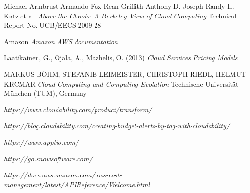 \documentclass[licencjacka,en]{thesisclass}
\begin{document}
\begin{thebibliography}{99}

Michael Armbrust Armando Fox Rean Griffith Anthony D. Joseph Randy H. Katz et al.
\textit{Above the Clouds: A Berkeley View of Cloud Computing} 
Technical Report No. UCB/EECS-2009-28

Amazon
\textit{Amazon AWS documentation} 
    
Laatikainen, G., Ojala, A., Mazhelis, O. (2013)
\textit{Cloud Services Pricing Models}

MARKUS BÖHM, STEFANIE LEIMEISTER, CHRISTOPH RIEDL, HELMUT KRCMAR
\textit{Cloud Computing and Computing Evolution}
Technische Universität München (TUM), Germany

\textit{https://www.cloudability.com/product/transform/}

\textit{https://blog.cloudability.com/creating-budget-alerts-by-tag-with-cloudability/}

\textit{https://www.apptio.com/}

\textit{https://go.snowsoftware.com/}

\textit{https://docs.aws.amazon.com/aws-cost-management/latest/APIReference/Welcome.html}

\end{thebibliography}
\end{document}
